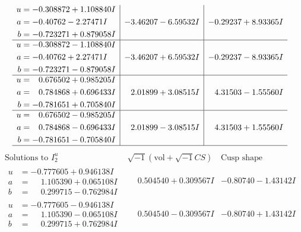 \documentclass[1p]{elsarticle_modified}
\theoremstyle{definition}
\newcommand{\I}{\sqrt{-1}}
\begin{document}
$$\begin{array}{c|c|c}
\begin{aligned}
u &= -0.308872 + 1.108840 I \\
a &= -0.40762 - 2.27471 I \\
b &= -0.723271 + 0.879058 I\end{aligned}
 & -3.46207 - 6.59532 I & -0.29237 + 8.93365 I \\ \hline\begin{aligned}
u &= -0.308872 - 1.108840 I \\
a &= -0.40762 + 2.27471 I \\
b &= -0.723271 - 0.879058 I\end{aligned}
 & -3.46207 + 6.59532 I & -0.29237 - 8.93365 I \\ \hline\begin{aligned}
u &= \phantom{-}0.676502 + 0.985205 I \\
a &= \phantom{-}0.784868 + 0.696433 I \\
b &= -0.781651 + 0.705840 I\end{aligned}
 & \phantom{-}2.01899 + 3.08515 I & \phantom{-}4.31503 - 1.55560 I \\ \hline\begin{aligned}
u &= \phantom{-}0.676502 - 0.985205 I \\
a &= \phantom{-}0.784868 - 0.696433 I \\
b &= -0.781651 - 0.705840 I\end{aligned}
 & \phantom{-}2.01899 - 3.08515 I & \phantom{-}4.31503 + 1.55560 I\\
 \hline 
 \end{array}$$\newpage$$\begin{array}{c|c|c}  
\text{Solutions to }I^u_{2}& \I (\text{vol} + \sqrt{-1}CS) & \text{Cusp shape}\\
 \hline 
\begin{aligned}
u &= -0.777605 + 0.946138 I \\
a &= \phantom{-}1.105390 + 0.065108 I \\
b &= \phantom{-}0.299715 - 0.762984 I\end{aligned}
 & \phantom{-}0.504540 + 0.309567 I & -0.80740 - 1.43142 I \\ \hline\begin{aligned}
u &= -0.777605 - 0.946138 I \\
a &= \phantom{-}1.105390 - 0.065108 I \\
b &= \phantom{-}0.299715 + 0.762984 I\end{aligned}
 & \phantom{-}0.504540 - 0.309567 I & -0.80740 + 1.43142 I \\ \hline\begin{aligned}

\end{aligned}
\end{array}$$
\end{document}
